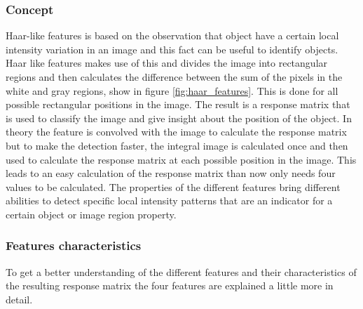 \subsubsection{Concept }
Haar-like features \cite{viola_rapid_nodate} is based on the observation that object have a certain local intensity variation in an image and this fact can be useful to identify objects. Haar like features makes use of this and divides the image into rectangular regions and then calculates the difference between the sum of the pixels in the white and gray regions, show in figure \ref{fig:haar_features}. This is done for all possible rectangular positions in the image. The result is a response matrix that is used to classify the image and give insight about the position of the object. In theory the feature is convolved with the image to calculate the response matrix but to make the detection faster, the integral image is calculated once and then used to calculate the response matrix at each possible position in the image.
 This leads to an easy calculation of the response matrix than now only needs four values to be calculated. 
The properties of the different features bring different abilities to detect specific local intensity patterns that are an indicator for a certain object or image region property. 
\subsubsection{Features characteristics}
To get a better understanding of the different features and their characteristics of the resulting response matrix the four features are explained a little more in detail. 
